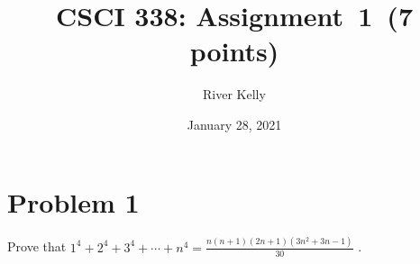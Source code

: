 \documentclass[11pt]{article}
\title{CSCI 338: Assignment~1~(7 points)}
\author{River Kelly}
\date{January 28, 2021}
\begin{document}
\maketitle


\newpage
\section*{Problem 1}
Prove that $1^{4} + 2^{4} +3^{4} + \cdots + n^{4} = \frac{n(n+1)(2n+1)(3n^{2}+3n-1)}{30}$ .
\end{document}
